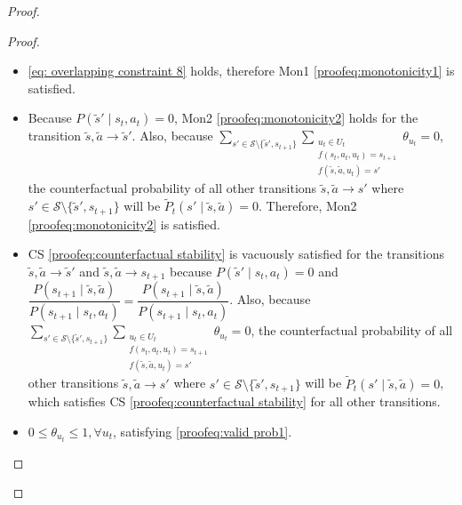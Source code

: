 \begin{proof}
\begin{proof}
\begin{itemize}
    \item \eqref{eq: overlapping constraint 8} holds, therefore Mon1 \eqref{proofeq:monotonicity1} is satisfied.
    
    \item Because $P(\tilde{s}' \mid s_t, a_t) =0$, Mon2 \eqref{proofeq:monotonicity2} holds for the transition $\tilde{s}, \tilde{a} \rightarrow \tilde{s}'$. Also, because $\sum_{s' \in \mathcal{S}\setminus\{\tilde{s}', s_{t+1}\}}\sum_{\substack{u_t \in U_t \\f(s_t, a_t, u_t) = s_{t+1} \\ f(\tilde{s}, \tilde{a}, u_t) = s'}}{\theta_{u_t}} = 0$, the counterfactual probability of all other transitions $\tilde{s}, \tilde{a} \rightarrow s'$ where $s' \in \mathcal{S}\setminus\{\tilde{s}', s_{t+1}\}$ will be $\tilde{P}_t(s' \mid \tilde{s}, \tilde{a}) = 0$. Therefore, Mon2 \eqref{proofeq:monotonicity2} is satisfied.

    \item CS \eqref{proofeq:counterfactual stability} is vacuously satisfied for the transitions $\tilde{s}, \tilde{a} \rightarrow \tilde{s}'$ and $\tilde{s}, \tilde{a} \rightarrow s_{t+1}$ because $P(\tilde{s}' \mid s_t, a_t) =0$ and $\dfrac{P(s_{t+1} \mid \tilde{s}, \tilde{a})}{P(s_{t+1} \mid s_t, a_t)} = \dfrac{P(s_{t+1} \mid \tilde{s}, \tilde{a})}{P(s_{t+1} \mid s_t, a_t)}$. Also, because \\$\sum_{s' \in \mathcal{S}\setminus\{\tilde{s}', s_{t+1}\}}\sum_{\substack{u_t \in U_t \\f(s_t, a_t, u_t) = s_{t+1} \\ f(\tilde{s}, \tilde{a}, u_t) = s'}}{\theta_{u_t}} = 0$, the counterfactual probability of all other transitions $\tilde{s}, \tilde{a} \rightarrow s'$ where $s' \in \mathcal{S}\setminus\{\tilde{s}', s_{t+1}\}$ will be $\tilde{P}_t(s' \mid \tilde{s}, \tilde{a}) = 0$, which satisfies CS \eqref{proofeq:counterfactual stability} for all other transitions.

    \item $0 \leq \theta_{u_t} \leq 1, \forall u_t$, satisfying \eqref{proofeq:valid prob1}.
    

\end{itemize}
\end{proof}
\end{proof}
